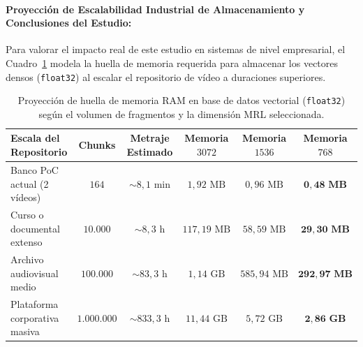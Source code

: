 \paragraph{Proyección de Escalabilidad Industrial de Almacenamiento y Conclusiones del Estudio:}
Para valorar el impacto real de este estudio en sistemas de nivel empresarial, el Cuadro~\ref{tab:proyeccion_memoria_mrl} modela la huella de memoria requerida para almacenar los vectores densos (\texttt{float32}) al escalar el repositorio de vídeo a duraciones superiores.

\begin{table}[htbp]
\centering
\small
\setlength{\tabcolsep}{4.0pt}
\caption{Proyección de huella de memoria RAM en base de datos vectorial (\texttt{float32}) según el volumen de fragmentos y la dimensión MRL seleccionada.}
\label{tab:proyeccion_memoria_mrl}
\begin{tabularx}{\linewidth}{l c c ccc}
\toprule
\textbf{Escala del Repositorio} & \textbf{Chunks} & \textbf{Metraje Estimado} & \textbf{Memoria $3072$} & \textbf{Memoria $1536$} & \textbf{Memoria $768$} \\
\midrule
Banco PoC actual (2 vídeos) & $164$ & $\sim 8,1\text{ min}$ & $1,92\text{ MB}$ & $0,96\text{ MB}$ & $\mathbf{0,48\text{ MB}}$ \\
Curso o documental extenso  & $10.000$ & $\sim 8,3\text{ h}$ & $117,19\text{ MB}$ & $58,59\text{ MB}$ & $\mathbf{29,30\text{ MB}}$ \\
Archivo audiovisual medio   & $100.000$ & $\sim 83,3\text{ h}$ & $1,14\text{ GB}$ & $585,94\text{ MB}$ & $\mathbf{292,97\text{ MB}}$ \\
Plataforma corporativa masiva & $1.000.000$ & $\sim 833,3\text{ h}$ & $11,44\text{ GB}$ & $5,72\text{ GB}$ & $\mathbf{2,86\text{ GB}}$ \\
\bottomrule
\end{tabularx}
\end{table}

